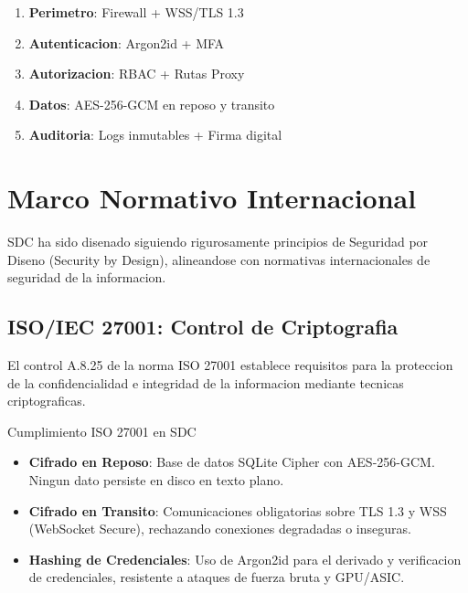 \begin{enumerate}
    \item \textbf{Perimetro}: Firewall + WSS/TLS 1.3
    \item \textbf{Autenticacion}: Argon2id + MFA
    \item \textbf{Autorizacion}: RBAC + Rutas Proxy
    \item \textbf{Datos}: AES-256-GCM en reposo y transito
    \item \textbf{Auditoria}: Logs inmutables + Firma digital
\end{enumerate}

\section{Marco Normativo Internacional}
\label{sec:marco-normativo}

SDC ha sido disenado siguiendo rigurosamente principios de Seguridad por Diseno (Security by Design), alineandose con normativas internacionales de seguridad de la informacion.


\subsection{ISO/IEC 27001: Control de Criptografia}

El control A.8.25 de la norma ISO 27001 establece requisitos para la proteccion de la confidencialidad e integridad de la informacion mediante tecnicas criptograficas.

\begin{caja}{Cumplimiento ISO 27001 en SDC}
\begin{itemize}
\item \textbf{Cifrado en Reposo}: Base de datos SQLite Cipher con AES-256-GCM. Ningun dato persiste en disco en texto plano.

\item \textbf{Cifrado en Transito}: Comunicaciones obligatorias sobre TLS 1.3 y WSS (WebSocket Secure), rechazando conexiones degradadas o inseguras.

\item \textbf{Hashing de Credenciales}: Uso de Argon2id para el derivado y verificacion de credenciales, resistente a ataques de fuerza bruta y GPU/ASIC.
\end{itemize}
\end{caja}

